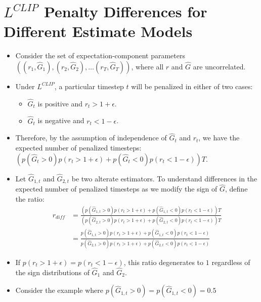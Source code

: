 \documentclass[a4paper]{article}
\begin{document}
\section*{$L^{CLIP}$ Penalty Differences for Different Estimate Models}
\begin{itemize}
    \item Consider the set of expectation-component parameters $((r_1, \hat{G}_1),
        (r_2, \hat{G}_2), \dots (r_T, \hat{G}_T))$, where all $r$ and $\hat{G}$
        are uncorrelated.
    \item Under $L^{CLIP}$, a particular timestep $t$ will be penalized in
        either of two cases:
    \begin{itemize}
        \item $\hat{G}_t$ is positive and $r_t > 1 + \epsilon$.
        \item $\hat{G}_t$ is negative and $r_t < 1 - \epsilon$.
    \end{itemize}
    \item Therefore, by the assumption of independence of $\hat{G}_t$ and
        $r_t$, we have the expected number of penalized timesteps:\\
        $(p(\hat{G}_t > 0)p(r_t > 1 + \epsilon) + p(\hat{G}_t < 0)p(r_t < 1 -
        \epsilon))T$.
    \item Let $\hat{G}_{1, t}$ and $\hat{G}_{2, t}$ be two alterate estimators.
        To understand differences in the expected number of penalized timesteps
        as we modify the sign of $\hat{G}$, define the ratio:
    \begin{align*}
        r_{diff} &= 
        \frac
        {(p(\hat{G}_{1, t} > 0)p(r_t > 1 + \epsilon) + p(\hat{G}_{1, t} <
        0)p(r_t < 1 - \epsilon))T}
        {(p(\hat{G}_{2, t} > 0)p(r_t > 1 + \epsilon) + p(\hat{G}_{2, t} <
        0)p(r_t < 1 - \epsilon))T}\\
        &=
        \frac
        {p(\hat{G}_{1, t} > 0)p(r_t > 1 + \epsilon) + p(\hat{G}_{1, t} <
        0)p(r_t < 1 - \epsilon)}
        {p(\hat{G}_{2, t} > 0)p(r_t > 1 + \epsilon) + p(\hat{G}_{2, t} <
        0)p(r_t < 1 - \epsilon)}
    \end{align*}
    \item If $p(r_t > 1 + \epsilon) = p(r_t < 1 - \epsilon)$, this ratio
        degenerates to $1$ regardless of the sign distributions of $\hat{G}_1$
        and $\hat{G}_2$.
    \item Consider the example where 
        $p(\hat{G}_{1, t} > 0) = p(\hat{G}_{1, t} < 0) = 0.5$

\end{itemize}
\end{document}
